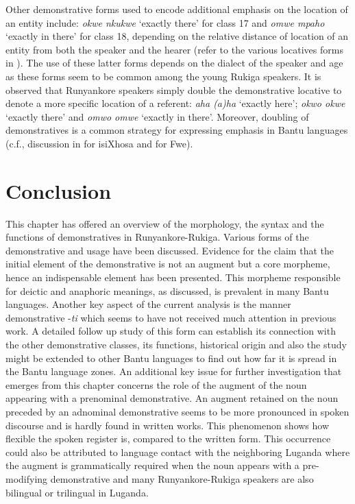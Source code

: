 \documentclass[output=paper 		  ]{langscibook}
\begin{document}
Other demonstrative forms used to encode additional emphasis on the location of an entity include: \textit{okwe nkukwe} ‘exactly there’ for class 17 and \textit{omwe mpaho} ‘exactly in there’ for class 18, depending on the relative distance of location of an entity from both the speaker and the hearer (refer to the various locatives forms in ). The use of these latter forms depends on the dialect of the speaker and age as these forms seem to be common among the young Rukiga speakers. It is observed that Runyankore speakers simply double the demonstrative locative to denote a more specific location of a referent: \textit{aha (a)ha} ‘exactly here’; \textit{okwo okwe} ‘exactly there’ and \textit{omwo omwe} ‘exactly in there’. Moreover, doubling of demonstratives is a common strategy for expressing emphasis in Bantu languages (c.f., discussion in \citealt{Malinga1980} for isiXhosa and \citealt{Gunnink2018} for Fwe).

\section{Conclusion}\label{sec:asiimwe:5}

This chapter has offered an overview of the morphology, the syntax and the functions of demonstratives in Run\-yan\-ko\-re-Ru\-ki\-ga. Various forms of the demonstrative and usage have been discussed. Evidence for the claim that the initial element of the demonstrative is not an augment but a core morpheme, hence an indispensable element has been presented. This morpheme responsible for deictic and anaphoric meanings, as discussed, is prevalent in many Bantu languages. Another key aspect of the current analysis is the manner demonstrative -\textit{ti} which seems to have not received much attention in previous work. A detailed follow up study of this form can establish its connection with the other demonstrative classes, its functions, historical origin and also the study might be extended to other Bantu languages to find out how far it is spread in the Bantu language zones. An additional key issue for further investigation that emerges from this chapter concerns the role of the augment of the noun appearing with a prenominal demonstrative. An augment retained on the noun preceded by an adnominal demonstrative seems to be more pronounced in spoken discourse and is hardly found in written works. This phenomenon shows how flexible the spoken register is, compared to the written form. This occurrence could also be attributed to language contact with the neighboring Luganda where the augment is grammatically required when the noun appears with a pre-modifying demonstrative and many Run\-yan\-ko\-re-Ru\-ki\-ga speakers are also bilingual or trilingual in Luganda.
\end{document}
